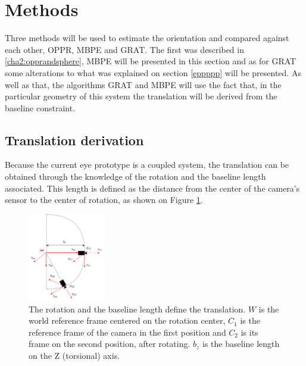 \section{Methods}
\label{chapter:methods}
Three methods will be used to estimate the orientation and compared against each other, OPPR, MBPE and GRAT. The first was described in \ref{cha2:opprandsphere}, MBPE will be presented in this section and as for GRAT some alterations to what was explained on section \ref{eppppp} will be presented. As well as that, the algorithms GRAT and MBPE will use the fact that, in the particular geometry of this system the translation will be derived from the baseline constraint.
\subsection{Translation derivation}
\label{rignreg}
Because the current eye prototype is a coupled system, the translation can be obtained through the knowledge of the rotation and the baseline length associated. This length is defined as the distance from the center of the camera's sensor to the center of rotation, as shown on Figure \ref{cha3:detori:translation}.
\begin{figure}[ht]
	\centering
	\includegraphics[width=0.3\textwidth]{images/transf.pdf}
	\caption[Translation derivation]{The rotation and the baseline length define the translation. ${W}$ is the world reference frame centered on the rotation center, ${C_1}$ is the reference frame of the camera in the first position and ${C_2}$ is its frame on the second position, after rotating. $b_z$ is the baseline length on the Z (torsional) axis.}
	\label{cha3:detori:translation}
\end{figure}

